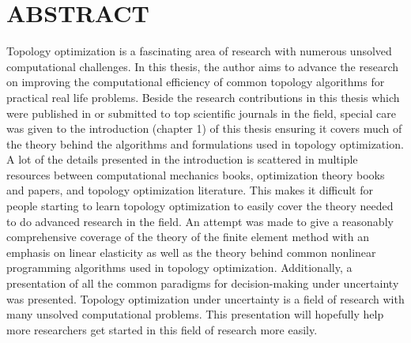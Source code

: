% 
% 
%


\chapter*{ABSTRACT}
\normalsize
{}

Topology optimization is a fascinating area of research with numerous unsolved computational challenges. In this thesis, the author aims to advance the research on improving the computational efficiency of common topology algorithms for practical real life problems. Beside the research contributions in this thesis which were published in or submitted to top scientific journals in the field, special care was given to the introduction (chapter 1) of this thesis ensuring it covers much of the theory behind the algorithms and formulations used in topology optimization. A lot of the details presented in the introduction is scattered in multiple resources between computational mechanics books, optimization theory books and papers, and topology optimization literature. This makes it difficult for people starting to learn topology optimization to easily cover the theory needed to do advanced research in the field. An attempt was made to give a reasonably comprehensive coverage of the theory of the finite element method with an emphasis on linear elasticity as well as the theory behind common nonlinear programming algorithms used in topology optimization. Additionally, a presentation of all the common paradigms for decision-making under uncertainty was presented. Topology optimization under uncertainty is a field of research with many unsolved computational problems. This presentation will hopefully help more researchers get started in this field of research more easily.

